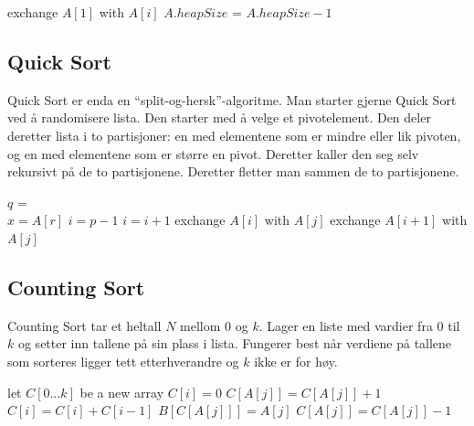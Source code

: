 \documentclass[a4paper, norsk,  10pt]{article}
\begin{document}
{{\begin{algorithmic}
\State {} 
	\State exchange $A[1]$ with $A[i]$
	\State $A.heapSize$ = $A.heapSize -1$
	\State {} 
\EndFor
\end{algorithmic}

\subsection{Quick Sort}

Quick Sort er enda en ``split-og-hersk''-algoritme. Man starter gjerne Quick Sort ved å randomisere lista. Den starter med å velge et pivotelement. Den deler deretter lista i to partisjoner: en med elementene som er mindre eller lik pivoten, og en med elementene som er større en pivot. Deretter kaller den seg selv rekursivt på de to partisjonene. Deretter fletter man sammen de to partisjonene.  \\

\begin{algorithmic}
	\State $q$ = 
	\State {}
	\State {}
\EndIf
\EndFunction \\

	\State $x = A[r]$
	\State $i = p - 1$
			\State $i = i + 1$
			\State exchange $A[i]$ with $A[j]$
		\EndIf
	\EndFor
\State exchange $A[i + 1]$ with $A[j]$
\State {}
\EndFunction
\end{algorithmic}

\subsection{Counting Sort}

Counting Sort tar et heltall $N$ mellom $0$ og $k$. Lager en liste med vardier fra $0$ til $k$ og setter inn tallene på sin plass i lista. Fungerer best når verdiene på tallene som sorteres ligger tett etterhverandre og $k$ ikke er for høy. \\

\begin{algorithmic}
\State let $C[0 \dots k]$ be a new array
\State $C[i]=0$
\EndFor
{}
\State $C[A[j]] = C[A[j]] + 1$
\EndFor
{}
\State $C[i] = C[i] + C[i -1]$
\EndFor
{}
\State $B[C[A[j]]] = A[j]$
\State $C[A[j]] = C[A[j]] - 1$
\EndFor
\EndFunction
\end{algorithmic}

}}
\end{document}
